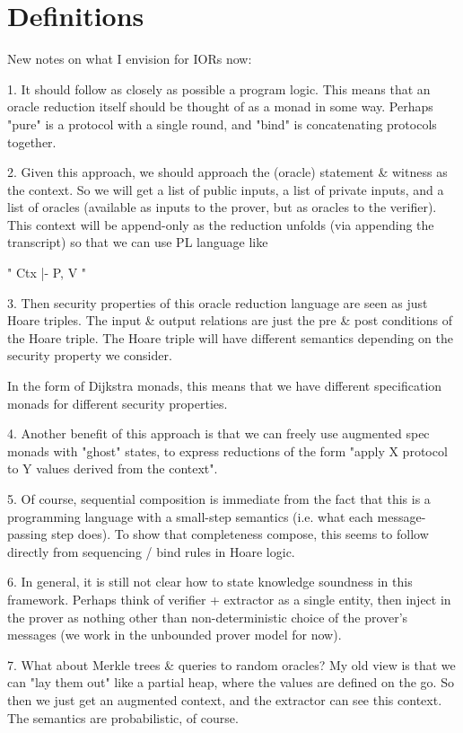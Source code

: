 \section{Definitions}

\iffalse

New notes on what I envision for IORs now:

1. It should follow as closely as possible a program logic. This means that an oracle reduction itself should be thought of as a monad in some way. Perhaps "pure" is a protocol with a single round, and "bind" is concatenating protocols together.

2. Given this approach, we should approach the (oracle) statement & witness as the context. So we will get a list of public inputs, a list of private inputs, and a list of oracles (available as inputs to the prover, but as oracles to the verifier). This context will be append-only as the reduction unfolds (via appending the transcript) so that we can use PL language like

" Ctx |- P, V "

3. Then security properties of this oracle reduction language are seen as just Hoare triples. The input & output relations are just the pre & post conditions of the Hoare triple. The Hoare triple will have different semantics depending on the security property we consider.

In the form of Dijkstra monads, this means that we have different specification monads for different security properties.

4. Another benefit of this approach is that we can freely use augmented spec monads with "ghost" states, to express reductions of the form "apply X protocol to Y values derived from the context".

5. Of course, sequential composition is immediate from the fact that this is a programming language with a small-step semantics (i.e. what each message-passing step does). To show that completeness compose, this seems to follow directly from sequencing / bind rules in Hoare logic.

6. In general, it is still not clear how to state knowledge soundness in this framework. Perhaps think of verifier + extractor as a single entity, then inject in the prover as nothing other than non-deterministic choice of the prover's messages (we work in the unbounded prover model for now).

7. What about Merkle trees & queries to random oracles? My old view is that we can "lay them out" like a partial heap, where the values are defined on the go. So then we just get an augmented context, and the extractor can see this context. The semantics are probabilistic, of course.

